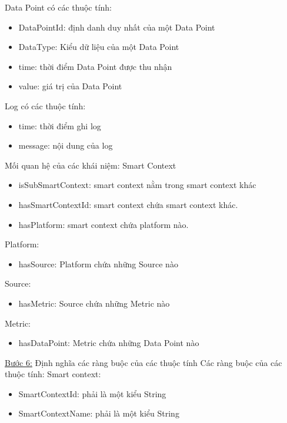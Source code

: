 \hspace{0mm}Data Point có các thuộc tính:
\begin{itemize}
	\item DataPointId: định danh duy nhất của một Data Point
	\item DataType: Kiểu dữ liệu của một Data Point
	\item time: thời điểm Data Point được thu nhận
	\item value: giá trị của Data Point
\end{itemize}
\hspace{0mm}Log có các thuộc tính:
\begin{itemize}
	\item time: thời điểm ghi log
	\item message: nội dung của log
\end{itemize}
\hspace{0mm}Mối quan hệ của các khái niệm:
\hspace{0mm}Smart Context
\begin{itemize}
	\item isSubSmartContext: smart context nằm trong smart context khác 
	\item hasSmartContextId: smart context chứa smart context khác.
	\item hasPlatform: smart context chứa platform nào.
\end{itemize}
\hspace{0mm}Platform:
\begin{itemize}
	\item hasSource: Platform chứa những Source nào
\end{itemize}
\hspace{0mm}Source:
\begin{itemize}
	\item hasMetric: Source chứa những Metric nào
\end{itemize}
\hspace{0mm}Metric:
\begin{itemize}
	\item hasDataPoint: Metric chứa những Data Point nào
\end{itemize}
\underline{Bước 6:} Định nghĩa các ràng buộc của các thuộc tính
\hspace{0mm}Các ràng buộc của các thuộc tính:
\hspace{0mm}Smart context: 
\begin{itemize}
	\item SmartContextId: phải là một kiểu String
	\item SmartContextName: phải là một kiểu String
\end{itemize}
